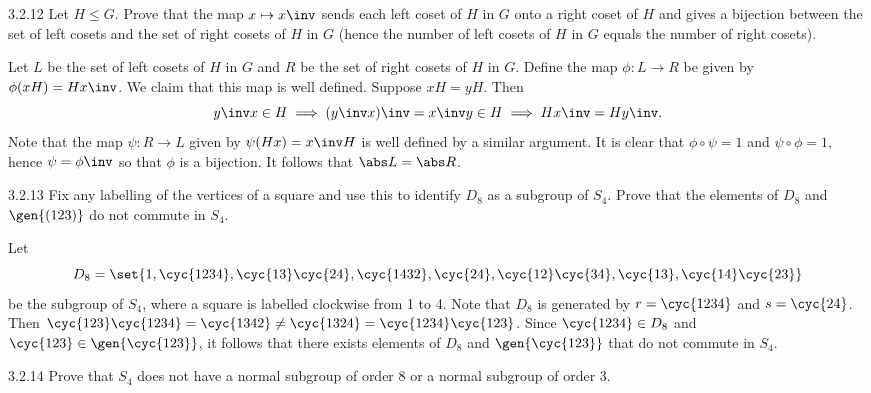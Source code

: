 \begin{exercise}{3.2.12}
    Let $H \leq G$.
	Prove that the map $x \mapsto x\inv$ sends each left coset of $H$ in $G$ onto a right coset of $H$ and gives a bijection between the set of left cosets and the set of right cosets of $H$ in $G$ (hence the number of left cosets of $H$ in $G$ equals the number of right cosets).
\end{exercise}

\begin{sol}
    Let $L$ be the set of left cosets of $H$ in $G$ and $R$ be the set of right cosets of $H$ in $G$.
	Define the map $\phi \colon L \to R$ be given by $\phi(xH) = Hx\inv$.
	We claim that this map is well defined. Suppose $xH = yH$.
	Then
	\[
		y\inv x \in H \implies (y\inv x)\inv = x\inv y \in H \implies Hx\inv = Hy\inv.
	\]
	Note that the map $\psi \colon R \to L$ given by $\psi(Hx) = x\inv H$ is well defined by a similar argument.
	It is clear that $\phi \circ \psi = 1$ and $\psi \circ \phi = 1$, hence $\psi = \phi\inv$ so that $\phi$ is a bijection.
	It follows that $\abs L = \abs R$.
\end{sol}

\begin{exercise}{3.2.13}
    Fix any labelling of the vertices of a square and use this to identify $D_8$ as a subgroup of $S_4$.
	Prove that the elements of $D_8$ and $\gen{(123)}$ do not commute in $S_4$.
\end{exercise}

\begin{sol}
    Let 
    \[
    	D_8 = \set{1, \cyc{1 2 3 4}, \cyc{1 3}\cyc{2 4}, \cyc{1 4 3 2}, \cyc{2 4}, \cyc{1 2}\cyc{3 4}, \cyc{1 3}, \cyc{1 4}\cyc{2 3}}
    \]
    be the subgroup of $S_4$, where a square is labelled clockwise from 1 to 4.
	Note that $D_8$ is generated by $r = \cyc{1 2 3 4}$ and $s = \cyc{2 4}$.
	Then $\cyc{1 2 3}\cyc{1 2 3 4} = \cyc{1 3 4 2} \neq \cyc{1 3 2 4} = \cyc{1 2 3 4}\cyc{1 2 3}$.
	Since $\cyc{1 2 3 4} \in D_8$ and $\cyc{1 2 3} \in \gen{\cyc{1 2 3}}$, it follows that there exists elements of $D_8$ and $\gen{\cyc{1 2 3}}$ that do not commute in $S_4$.
\end{sol}

\begin{exercise}{3.2.14}
    Prove that $S_4$ does not have a normal subgroup of order 8 or a normal subgroup of order 3.
\end{exercise}

